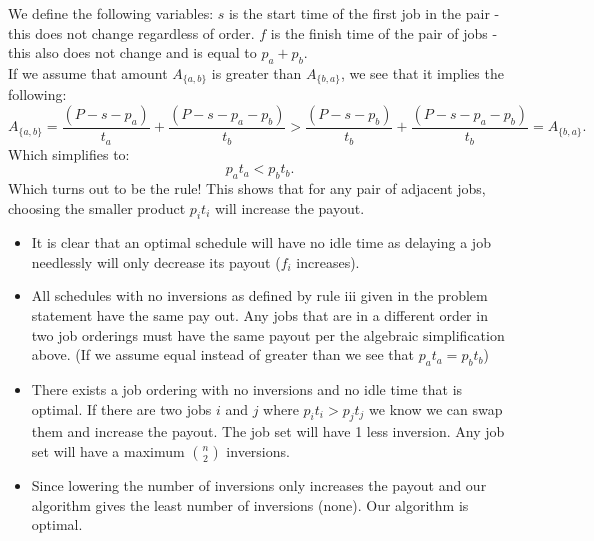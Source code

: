\documentclass[letterpaper,11pt]{article}
\begin{document}
\begin{enumerate}
\begin{itemize}
\begin{itemize}
              We define the following variables: $s$ is the start time of the 
              first job in the pair - this does not change regardless of order.
              $f$ is the finish time of the pair of jobs - this also does not 
              change and is equal to $p_a + p_b$.\\

              If we assume that amount $A_{\{a, b\} }$ is greater than $A_{\{b, a\} }$, we see that it implies the following:
              \[
                  A_{\{a, b\} } = \frac{\left( P - s - p_a \right) }{t_a} + \frac{\left( P - s - p_a - p_b \right) }{t_b} > \frac{\left( P - s - p_b \right) }{t_b} + \frac{\left( P - s - p_a - p_b \right) }{t_b} = A_{\{b, a\} }
              .\] 
              Which simplifies to:
              \[
              p_at_a < p_bt_b
              .\] 
              Which turns out to be the rule! This shows that for any pair of 
              adjacent jobs, choosing the smaller product $p_it_i$ will increase 
              the payout.\\

              \begin{itemize}
                  \item It is clear that an optimal schedule will have no idle 
                      time as delaying a job needlessly will only decrease its
                      payout ($f_i$ increases).
                  \item All schedules with no inversions as defined by rule iii
                      given in the problem statement have the same pay out.
                      Any jobs that are in a different order in two job orderings 
                      must have the same payout per the algebraic simplification 
                      above. (If we assume equal instead of greater than we see
                      that $p_at_a = p_bt_b$)
                  \item There exists a job ordering with no inversions and no idle
                      time that is optimal. If there are two jobs $i$ and $j$ 
                      where $p_it_i > p_jt_j$ we know we can swap them and 
                      increase the payout. The job set will have 1 less inversion.
                      Any job set will have a maximum $n \choose 2$ inversions.
                  \item Since lowering the number of inversions only increases 
                      the payout and our algorithm gives the least number of 
                      inversions (none). Our algorithm is optimal.
              \end{itemize}


\end{itemize}
\end{itemize}
\end{enumerate}
\end{document}
